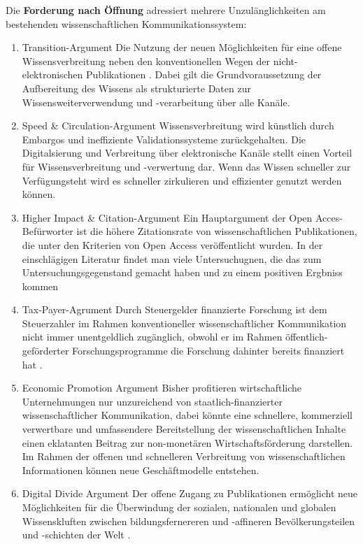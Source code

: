Die \textbf{Forderung nach Öffnung} adressiert mehrere Unzulänglichkeiten am bestehenden wissenschaftlichen Kommunikationssystem:
\begin{enumerate}
\item Transition-Argument
Die Nutzung der neuen Möglichkeiten für eine offene Wissensverbreitung neben den konventionellen Wegen der nicht-elektronischen Publikationen . Dabei gilt die Grundvoraussetzung der Aufbereitung des Wissens als strukturierte Daten zur Wissensweiterverwendung und -verarbeitung über alle Kanäle.
\item Speed & Circulation-Argument
Wissensverbreitung wird künstlich durch Embargos und ineffiziente Validationssysteme zurückgehalten. Die Digitalsierung und Verbreitung über elektronische Kanäle stellt einen Vorteil für Wissensverbreitung und -verwertung dar. Wenn das Wissen schneller zur Verfügungsteht wird es schneller zirkulieren und effizienter genutzt werden können.  
\item Higher Impact & Citation-Argument
Ein Hauptargument der Open Acces-Befürworter ist die höhere Zitationsrate von wissenschaftlichen Publikationen, die unter den Kriterien von Open Access veröffentlicht wurden\cite{cite:21a}. In der einschlägigen Literatur findet man viele Untersuchugnen, die das zum Untersuchungsgegenstand gemacht haben und zu einem positiven Ergbniss kommen \cite{Lawrence_2001}\cite{Jeffrey_2008}\cite{Eysenbach_2006}\cite{Antelman_2004}
\item Tax-Payer-Agrument
Durch Steuergelder finanzierte Forschung ist dem Steuerzahler im Rahmen konventioneller wissenschaftlicher Kommunikation nicht immer unentgeldlich zugänglich, obwohl er im Rahmen öffentlich-geförderter Forschungsprogramme die Forschung dahinter bereits finanziert  hat .
\item Economic Promotion Argument
Bisher profitieren wirtschaftliche Unternehmungen nur unzureichend von staatlich-finanzierter wissenschaftlicher Kommunikation, dabei könnte eine schnellere, kommerziell verwertbare und umfassendere Bereitstellung der wissenschaftlichen Inhalte einen eklatanten Beitrag zur non-monetären Wirtschaftsförderung darstellen. Im Rahmen der offenen und schnelleren Verbreitung von wissenschaftlichen Informationen können neue Geschäftmodelle  entstehen.
\item Digital Divide Argument
Der offene Zugang zu Publikationen ermöglicht neue Möglichkeiten für die Überwindung der sozialen, nationalen und globalen Wissenskluften  zwischen bildungsfernereren und -affineren Bevölkerungsteilen und -schichten der Welt .

\end{enumerate}
